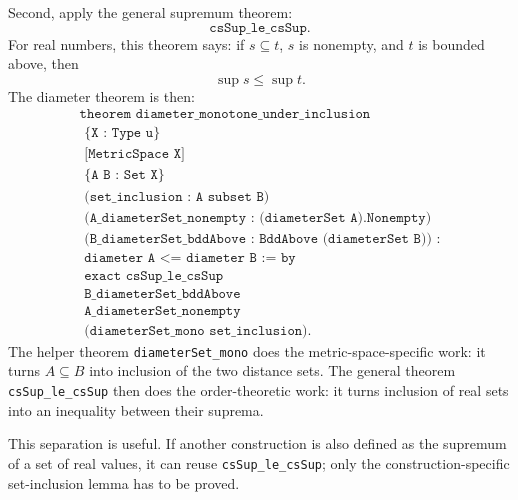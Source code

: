\begin{remark*}
Second, apply the general supremum theorem:
\[
  \texttt{csSup\_le\_csSup}.
\]
For real numbers, this theorem says: if \(s \subseteq t\), \(s\) is nonempty,
and \(t\) is bounded above, then
\[
  \sup s \le \sup t.
\]
The diameter theorem is then:
\[
\begin{gathered}
  \texttt{theorem diameter\_monotone\_under\_inclusion}\\
  \texttt{\ \ \ \ \{X : Type u\}}\\
  \texttt{\ \ \ \ [MetricSpace X]}\\
  \texttt{\ \ \ \ \{A B : Set X\}}\\
  \texttt{\ \ \ \ (set\_inclusion : A subset B)}\\
  \texttt{\ \ \ \ (A\_diameterSet\_nonempty : (diameterSet A).Nonempty)}\\
  \texttt{\ \ \ \ (B\_diameterSet\_bddAbove : BddAbove (diameterSet B)) :}\\
  \texttt{\ \ \ \ diameter A <= diameter B := by}\\
  \texttt{\ \ exact csSup\_le\_csSup}\\
  \texttt{\ \ \ \ B\_diameterSet\_bddAbove}\\
  \texttt{\ \ \ \ A\_diameterSet\_nonempty}\\
  \texttt{\ \ \ \ (diameterSet\_mono set\_inclusion).}
\end{gathered}
\]
The helper theorem \texttt{diameterSet\_mono} does the metric-space-specific
work: it turns \(A \subseteq B\) into inclusion of the two distance sets. The
general theorem \texttt{csSup\_le\_csSup} then does the order-theoretic work:
it turns inclusion of real sets into an inequality between their suprema.

This separation is useful. If another construction is also defined as the
supremum of a set of real values, it can reuse \texttt{csSup\_le\_csSup}; only
the construction-specific set-inclusion lemma has to be proved.
\end{remark*}
